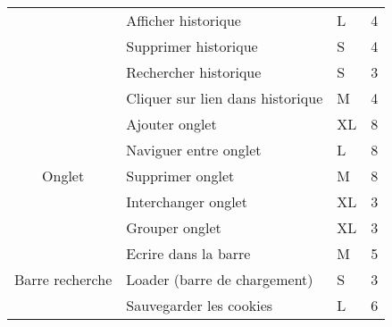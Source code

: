 \documentclass[10pt,a4paper]{article}
\begin{document}
\begin{table}[H]
\begin{tabular}{|c|l|l|l|}
                                        & Afficher historique                          & L                                            & 4                                           \\ \cline{2-4} 
                                        & Supprimer historique                         & S                                            & 4                                           \\ \cline{2-4} 
                                        & Rechercher historique                        & S                                            & 3                                           \\ \cline{2-4} 
                                        & Cliquer sur lien dans historique             & M                                            & 4                                           \\ \hline
\multirow{5}{*}{Onglet}                 & Ajouter onglet                               & XL                                           & 8                                           \\ \cline{2-4} 
                                        & Naviguer entre onglet                        & L                                            & 8                                           \\ \cline{2-4} 
                                        & Supprimer onglet                             & M                                            & 8                                           \\ \cline{2-4} 
                                        & Interchanger onglet                          & XL                                           & 3                                           \\ \cline{2-4} 
                                        & Grouper onglet                               & XL                                           & 3                                           \\ \hline
\multirow{5}{*}{Barre recherche}        & Ecrire dans la barre                         & M                                            & 5                                           \\ \cline{2-4} 
                                        & Loader (barre de chargement)                 & S                                            & 3                                           \\ \cline{2-4} 
                                        & Sauvegarder les cookies                      & L                                            & 6                                           \\ \cline{2-4} 

\end{tabular}
\end{table}
\end{document}
